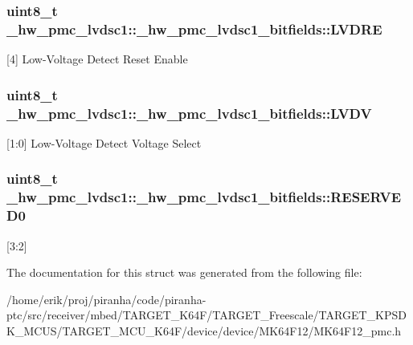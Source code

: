 \subsubsection[{\texorpdfstring{L\+V\+D\+RE}{LVDRE}}]{\setlength{\rightskip}{0pt plus 5cm}uint8\+\_\+t \+\_\+hw\+\_\+pmc\+\_\+lvdsc1\+::\+\_\+hw\+\_\+pmc\+\_\+lvdsc1\+\_\+bitfields\+::\+L\+V\+D\+RE}\hypertarget{struct__hw__pmc__lvdsc1_1_1__hw__pmc__lvdsc1__bitfields_af465f8f9464ef525031bdd0363bc5651}{}\label{struct__hw__pmc__lvdsc1_1_1__hw__pmc__lvdsc1__bitfields_af465f8f9464ef525031bdd0363bc5651}
\mbox{[}4\mbox{]} Low-\/\+Voltage Detect Reset Enable 
\subsubsection[{\texorpdfstring{L\+V\+DV}{LVDV}}]{\setlength{\rightskip}{0pt plus 5cm}uint8\+\_\+t \+\_\+hw\+\_\+pmc\+\_\+lvdsc1\+::\+\_\+hw\+\_\+pmc\+\_\+lvdsc1\+\_\+bitfields\+::\+L\+V\+DV}\hypertarget{struct__hw__pmc__lvdsc1_1_1__hw__pmc__lvdsc1__bitfields_a543b9e46c5aa0efa4a4dcb0f56fa23e1}{}\label{struct__hw__pmc__lvdsc1_1_1__hw__pmc__lvdsc1__bitfields_a543b9e46c5aa0efa4a4dcb0f56fa23e1}
\mbox{[}1\+:0\mbox{]} Low-\/\+Voltage Detect Voltage Select 
\subsubsection[{\texorpdfstring{R\+E\+S\+E\+R\+V\+E\+D0}{RESERVED0}}]{\setlength{\rightskip}{0pt plus 5cm}uint8\+\_\+t \+\_\+hw\+\_\+pmc\+\_\+lvdsc1\+::\+\_\+hw\+\_\+pmc\+\_\+lvdsc1\+\_\+bitfields\+::\+R\+E\+S\+E\+R\+V\+E\+D0}\hypertarget{struct__hw__pmc__lvdsc1_1_1__hw__pmc__lvdsc1__bitfields_a427c1b1fcb65455a16320fb1994213ae}{}\label{struct__hw__pmc__lvdsc1_1_1__hw__pmc__lvdsc1__bitfields_a427c1b1fcb65455a16320fb1994213ae}
\mbox{[}3\+:2\mbox{]} 

The documentation for this struct was generated from the following file\+:\begin{DoxyCompactItemize}
\item 
/home/erik/proj/piranha/code/piranha-\/ptc/src/receiver/mbed/\+T\+A\+R\+G\+E\+T\+\_\+\+K64\+F/\+T\+A\+R\+G\+E\+T\+\_\+\+Freescale/\+T\+A\+R\+G\+E\+T\+\_\+\+K\+P\+S\+D\+K\+\_\+\+M\+C\+U\+S/\+T\+A\+R\+G\+E\+T\+\_\+\+M\+C\+U\+\_\+\+K64\+F/device/device/\+M\+K64\+F12/M\+K64\+F12\+\_\+pmc.\+h\end{DoxyCompactItemize}
